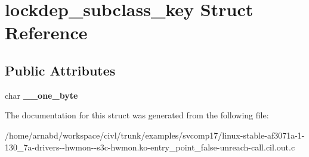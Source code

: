 \hypertarget{structlockdep__subclass__key}{}\section{lockdep\+\_\+subclass\+\_\+key Struct Reference}
\label{structlockdep__subclass__key}
\subsection*{Public Attributes}
\begin{DoxyCompactItemize}
\item 
\hypertarget{structlockdep__subclass__key_a767ec5e4dab556b12af88aacad8a284a}{}char {\bfseries \+\_\+\+\_\+one\+\_\+byte}\label{structlockdep__subclass__key_a767ec5e4dab556b12af88aacad8a284a}

\end{DoxyCompactItemize}


The documentation for this struct was generated from the following file\+:\begin{DoxyCompactItemize}
\item 
/home/arnabd/workspace/civl/trunk/examples/svcomp17/linux-\/stable-\/af3071a-\/1-\/130\+\_\+7a-\/drivers-\/-\/hwmon-\/-\/s3c-\/hwmon.\+ko-\/entry\+\_\+point\+\_\+false-\/unreach-\/call.\+cil.\+out.\+c\end{DoxyCompactItemize}
